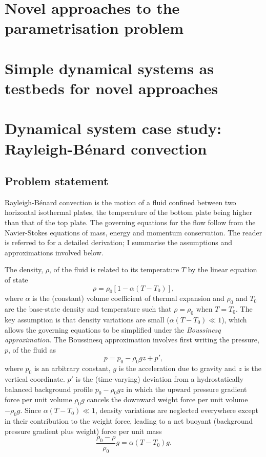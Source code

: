 \documentclass[titlepage]{article}
\numberwithin{equation}{section}
\newcommand{\rb}{Rayleigh-B\'{e}nard}
\begin{document}
\newpage
\section{Novel approaches to the parametrisation problem}

\section{Simple dynamical systems as testbeds for novel approaches}

\newpage
\section{Dynamical system case study: \rb{} convection}
\subsection{Problem statement}
\rb{} convection is the motion of a fluid confined between two
horizontal isothermal plates, the temperature of the bottom plate being
higher than that of the top plate. The governing equations for the flow
follow from the Navier-Stokes equations of mass, energy and momentum
conservation. The reader is referred to \textcite{chandrasekhar1961} for
a detailed derivation; I summarise the assumptions and approximations
involved below.

The density, $\rho$, of the fluid is related to its temperature $T$ by
the linear equation of state
\[
    \rho = \rho_0 [1 - \alpha(T - T_0)],
\]
where $\alpha$ is the (constant) volume coefficient of thermal expansion and
$\rho_0$ and $T_0$ are the base-state density and temperature such that $\rho =
\rho_0$ when $T = T_0$. The key assumption is that density variations are small
($\alpha (T - T_0) \ll 1$), which allows the governing equations to be
simplified under the \emph{Boussinesq approximation}. The Boussinesq
approximation involves first writing the pressure, $p$, of the fluid as
\[
    p = p_0 - \rho_0 gz + p',
\]
where $p_0$ is an arbitrary constant, $g$ is the acceleration due to gravity
and $z$ is the vertical coordinate. $p'$ is the (time-varying) deviation from
a hydrostatically balanced background profile $p_0 - \rho_0 gz$
in which the upward pressure gradient force per unit volume $\rho_0 g$ cancels
the downward weight force per unit volume $-\rho_0 g$. Since
$\alpha (T - T_0) \ll 1$, density variations are neglected everywhere except
in their contribution to the weight force, leading to a net buoyant
(background pressure gradient plus weight) force per unit mass
\[
    \frac{\rho_0 - \rho}{\rho_0} g = \alpha (T - T_0) g.
\]
\end{document}
